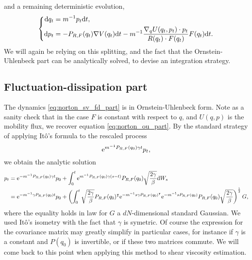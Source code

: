 and a remaining deterministic evolution,
\begin{equation}
    \label{eq:norton_sv_constrained_hamiltonian}
    \left\{
        \begin{aligned}
            \mathrm{d} q_t &= m^{-1}p_t\mathrm{d} t,\\
            \mathrm{d} p_t &= -P_{R,F}(q_t)\nabla V(q_t)\mathrm{d} t -m^{-1}\frac{\nabla_q U(q_t,p_t)\cdot p_t}{R(q_t)\cdot F(q_t)}F(q_t)\mathrm{d} t.\\
        \end{aligned}
    \right.
\end{equation}
We will again be relying on this splitting, and the fact that the Ornstein-Uhlenbeck part can be analytically solved, to devise an integration strategy.
\subsection{Fluctuation-dissipation part}
The dynamics \eqref{eq:norton_sv_fd_part} is in Ornstein-Uhlenbeck form. Note as a sanity check that in the case $F$ is constant with respect to $q$, and $U(q,p)$ is the mobility flux, we recover equation \eqref{eq:norton_ou_part}.
By the standard strategy of applying Itô's formula to the rescaled process
\[\mathrm{e}^{m^{-1}P_{R,F}(q_0)\gamma t}p_t,\]
we obtain the analytic solution 
\begin{equation}
    \label{eq:norton_sv_fd_part_solved}
    \begin{aligned}
        p_t&=\mathrm{e}^{-m^{-1}P_{R,F}(q_0)\gamma t}p_0+\int_0^t \mathrm{e}^{m^{-1}P_{R,F}(q_0)\gamma (s-t)}P_{R,F}(q_0)\sqrt{\frac{2\gamma}{\beta}}\mathrm{d} W_s\\
        &=\mathrm{e}^{-m^{-1}\gamma P_{R,F}(q_0)t}p_0+\left(\int_0^t\sqrt{\frac{2\gamma}{\beta}}P_{R,F}(q_0)^\intercal\mathrm{e}^{-m^{-1}s\gamma P_{R,F}(q_0)^\intercal}\mathrm{e}^{-m^{-1}sP_{R,F}(q_0)}P_{R,F}(q_0)\sqrt{\frac{2\gamma}{\beta}}\right)^{\frac12}G,
    \end{aligned}
\end{equation}
where the equality holds in law for $G$ a $dN$-dimensional standard Gaussian. We used Itô's isometry with the fact that $\gamma$ is symetric. Of course the expression for the covariance matrix may greatly simplify in particular cases, for instance if $\gamma$ is a constant and $P(q_0)$ is invertible, or if these two matrices commute.
We will come back to this point when applying this method to shear viscosity estimation.
